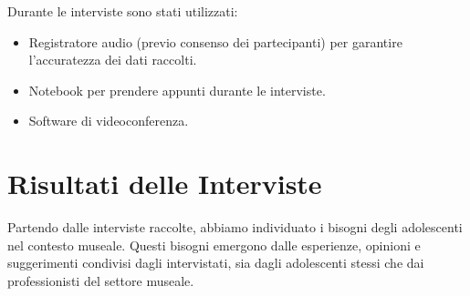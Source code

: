 \documentclass{article}
\begin{document}
Durante le interviste sono stati utilizzati:

\begin{itemize}
    \item Registratore audio (previo consenso dei partecipanti) per garantire l'accuratezza dei dati raccolti.
    \item Notebook per prendere appunti durante le interviste.
    \item Software di videoconferenza.
\end{itemize}

\section{Risultati delle Interviste}
Partendo dalle interviste raccolte, abbiamo individuato i bisogni degli adolescenti nel contesto museale. Questi bisogni emergono dalle esperienze, opinioni e suggerimenti condivisi dagli intervistati, sia dagli adolescenti stessi che dai professionisti del settore museale.
\end{document}
